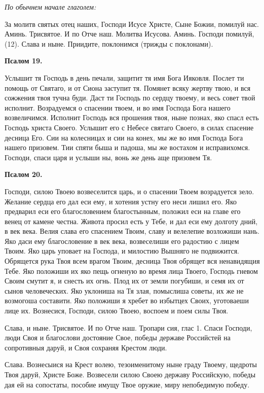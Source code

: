 \itshape По обычнем начале глаголем:\normalfont{}


За молитв святых отец наших, Господи Исусе Христе, Сыне Божии, помилуй нас. Аминь. Трисвятое. И по Отче наш. Молитва Исусова. Аминь. Господи помилуй, (12). Слава и ныне. Приидите, поклонимся (трижды с поклонами).


\medskip


\bfseries Псалом 19.\normalfont{}


Услышит тя Господь в день печали, защитит тя имя Бога Ияковля. Послет ти помощь от Святаго, и от Сиона заступит тя. Помянет всяку жертву твою, и вся сожжения твоя тучна буди. Даст ти Господь по сердцу твоему, и весь совет твой исполнит. Возрадуемся о спасении твоем, и во имя Господа Бога нашего возвеличимся. Исполнит Господь вся прошения твоя, ныне познах, яко спасл есть Господь христа Своего. Услышит его с Небесе святаго Своего, в силах спасение десница Его. Сии на колесницах и сии на конех, мы же во имя Господа Бога нашего призовем. Тии спяти быша и падоша, мы же востахом и исправихомся. Господи, спаси царя и услыши ны, вонь же день аще призовем Тя. 


\medskip


\bfseries Псалом 20.\normalfont{}


Господи, силою Твоею возвеселится царь, и о спасении Твоем возрадуется зело. Желание сердца его дал еси ему, и хотения устну его неси лишил его. Яко предварил еси его благословением благостынным, положил еси на главе его венец от камене честна. Живота просил есть у Тебе, и дал еси ему долготу дний, в век века. Велия слава его спасением Твоим, славу и велелепие возложиши нань. Яко даси ему благословение в век века, возвеселиши его радостию с лицем Твоим. Яко царь уповает на Господа, и милостию Вышняго не подвижится. Обрящется рука Твоя всем врагом Твоим, десница Твоя обрящет вся ненавидящия Тебе. Яко положиши их яко пещь огненую во время лица Твоего, Господь гневом Своим смутит я, и снесть их огнь. Плод их от земли погубиши, и семя их от сынов человеческих. Яко уклониша на Тя злая, помыслиша советы, их же не возмогоша составити. Яко положиши я хребет во избытцех Своих, уготоваеши лице их. Вознесися, Господи, силою Твоею, воспоем и поем силы Твоя. 

Слава, и ныне. Трисвятое. И по Отче наш. Тропари сия, глас 1. Спаси Господи, люди Своя и благослови достояние Свое, победы державе Российстей на сопротивныя даруй, и Своя сохраняя Крестом люди.

Слава. Вознесыися на Крест волею, тезоименитому ныне граду Твоему, щедроты Твоя даруй, Христе Боже. Возвесели силою Своею державу Российскую, победы дая ей на сопостаты, пособие имущу Твое оружие, миру непобедимую победу.


